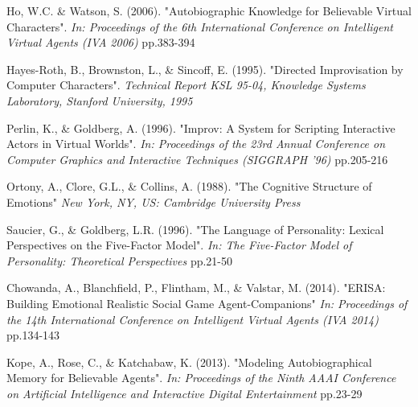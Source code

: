 \documentclass{sig-alternate-05-2015}
\begin{document}
\begin{thebibliography}{20}
Ho, W.C. \& Watson, S. (2006).
"Autobiographic Knowledge for Believable Virtual Characters".
\textit{In: Proceedings of the 6th International Conference on Intelligent Virtual Agents (IVA 2006)} pp.383-394

Hayes-Roth, B., Brownston, L., \& Sincoff, E. (1995).
"Directed Improvisation by Computer Characters".
\textit{Technical Report KSL 95-04, Knowledge Systems Laboratory, Stanford University, 1995}

Perlin, K., \& Goldberg, A. (1996).
"Improv: A System for Scripting Interactive Actors in Virtual Worlds".
\textit{In: Proceedings of the 23rd Annual Conference on Computer Graphics and Interactive Techniques (SIGGRAPH '96)} pp.205-216

Ortony, A., Clore, G.L., \& Collins, A. (1988).
"The Cognitive Structure of Emotions"
\textit{New York, NY, US: Cambridge University Press}

Saucier, G., \& Goldberg, L.R. (1996).
"The Language of Personality: Lexical Perspectives on the Five-Factor Model".
\textit{In: The Five-Factor Model of Personality:
Theoretical Perspectives} pp.21-50

Chowanda, A., Blanchfield, P., Flintham, M., \& Valstar, M. (2014). 
"ERISA: Building Emotional Realistic Social Game Agent-Companions"
\textit{In: Proceedings of the 14th International Conference on Intelligent Virtual Agents (IVA 2014)} pp.134-143 

Kope, A., Rose, C., \& Katchabaw, K. (2013).
"Modeling Autobiographical Memory for Believable Agents".
\textit{In: Proceedings of the Ninth AAAI Conference on Artificial Intelligence and Interactive Digital Entertainment} pp.23-29




\end{thebibliography}
 
\end{document}
